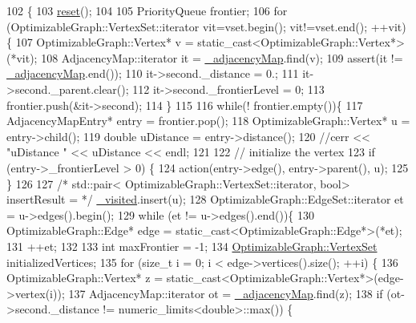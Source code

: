 \begin{DoxyCode}
102   \{
103     \hyperlink{classg2o_1_1EstimatePropagator_a8319099eda0552b9ef62a0bb40bb0785}{reset}();
104 
105     PriorityQueue frontier;
106     \textcolor{keywordflow}{for} (OptimizableGraph::VertexSet::iterator vit=vset.begin(); vit!=vset.end(); ++vit)\{
107       OptimizableGraph::Vertex* v = \textcolor{keyword}{static\_cast<}OptimizableGraph::Vertex*\textcolor{keyword}{>}(*vit);
108       AdjacencyMap::iterator it = \hyperlink{classg2o_1_1EstimatePropagator_ac3f6429938db62696444fd7ee765439a}{\_adjacencyMap}.find(v);
109       assert(it != \hyperlink{classg2o_1_1EstimatePropagator_ac3f6429938db62696444fd7ee765439a}{\_adjacencyMap}.end());
110       it->second.\_distance = 0.;
111       it->second.\_parent.clear();
112       it->second.\_frontierLevel = 0;
113       frontier.push(&it->second);
114     \}
115 
116     \textcolor{keywordflow}{while}(! frontier.empty())\{
117       AdjacencyMapEntry* entry = frontier.pop();
118       OptimizableGraph::Vertex* u = entry->child();
119       \textcolor{keywordtype}{double} uDistance = entry->distance();
120       \textcolor{comment}{//cerr << "uDistance " << uDistance << endl;}
121 
122       \textcolor{comment}{// initialize the vertex}
123       \textcolor{keywordflow}{if} (entry->\_frontierLevel > 0) \{
124         action(entry->edge(), entry->parent(), u);
125       \}
126 
127       \textcolor{comment}{/* std::pair< OptimizableGraph::VertexSet::iterator, bool> insertResult = */} 
      \hyperlink{classg2o_1_1EstimatePropagator_a1256927d6d1832ee300daa53d1c845a2}{\_visited}.insert(u);
128       OptimizableGraph::EdgeSet::iterator et = u->edges().begin();
129       \textcolor{keywordflow}{while} (et != u->edges().end())\{
130         OptimizableGraph::Edge* edge = \textcolor{keyword}{static\_cast<}OptimizableGraph::Edge*\textcolor{keyword}{>}(*et);
131         ++et;
132 
133         \textcolor{keywordtype}{int} maxFrontier = -1;
134         \hyperlink{classg2o_1_1HyperGraph_a703938cdb4bb636860eed55a2489d70c}{OptimizableGraph::VertexSet} initializedVertices;
135         \textcolor{keywordflow}{for} (\textcolor{keywordtype}{size\_t} i = 0; i < edge->vertices().size(); ++i) \{
136           OptimizableGraph::Vertex* z = \textcolor{keyword}{static\_cast<}OptimizableGraph::Vertex*\textcolor{keyword}{>}(edge->vertex(i));
137           AdjacencyMap::iterator ot = \hyperlink{classg2o_1_1EstimatePropagator_ac3f6429938db62696444fd7ee765439a}{\_adjacencyMap}.find(z);
138           \textcolor{keywordflow}{if} (ot->second.\_distance != numeric\_limits<double>::max()) \{

\end{DoxyCode}
